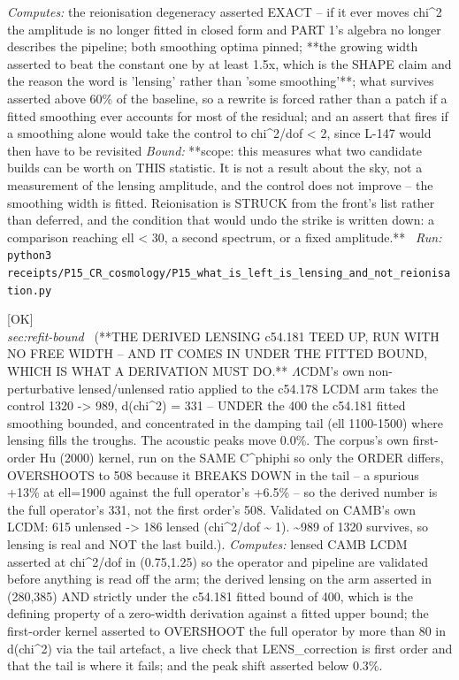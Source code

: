 \begin{description}
\emph{Computes:} the reionisation degeneracy asserted EXACT -- if it ever moves chi\textasciicircum{}2 the amplitude is no longer fitted in closed form and PART 1's algebra no longer describes the pipeline; both smoothing optima pinned; **the growing width asserted to beat the constant one by at least 1.5x, which is the SHAPE claim and the reason the word is 'lensing' rather than 'some smoothing'**; what survives asserted above 60\% of the baseline, so a rewrite is forced rather than a patch if a fitted smoothing ever accounts for most of the residual; and an assert that fires if a smoothing alone would take the control to chi\textasciicircum{}2/dof < 2, since L-147 would then have to be revisited
 \emph{Bound:} **scope: this measures what two candidate builds can be worth on THIS statistic. It is not a result about the sky, not a measurement of the lensing amplitude, and the control does not improve -- the smoothing width is fitted. Reionisation is STRUCK from the front's list rather than deferred, and the condition that would undo the strike is written down: a comparison reaching ell < 30, a second spectrum, or a fixed amplitude.**
\ \emph{Run:} \texttt{python3 receipts/P15\_CR\_cosmology/P15\_what\_is\_left\_is\_lensing\_and\_not\_reionisation.py}
\item[\rcptlabel{P15_derived_lensing_on_the_lcdm_arm}{P15R74}\textbf{P15R74}\quad\texttt{P15\_derived\_lensing\_on\_the\_lcdm\_arm}]\hfill\textsf{[OK]}\\
\textit{sec:refit-bound} \ (**THE DERIVED LENSING c54.181 TEED UP, RUN WITH NO FREE WIDTH -- AND IT COMES IN UNDER THE FITTED BOUND, WHICH IS WHAT A DERIVATION MUST DO.** \ensuremath{\Lambda}CDM's own non-perturbative lensed/unlensed ratio applied to the c54.178 LCDM arm takes the control 1320 -> 989, d(chi\textasciicircum{}2) = 331 -- UNDER the 400 the c54.181 fitted smoothing bounded, and concentrated in the damping tail (ell 1100-1500) where lensing fills the troughs. The acoustic peaks move 0.0\%. The corpus's own first-order Hu (2000) kernel, run on the SAME C\textasciicircum{}phiphi so only the ORDER differs, OVERSHOOTS to 508 because it BREAKS DOWN in the tail -- a spurious +13\% at ell=1900 against the full operator's +6.5\% -- so the derived number is the full operator's 331, not the first order's 508. Validated on CAMB's own LCDM: 615 unlensed -> 186 lensed (chi\textasciicircum{}2/dof \textasciitilde{} 1). \textasciitilde{}989 of 1320 survives, so lensing is real and NOT the last build.). 
\emph{Computes:} lensed CAMB LCDM asserted at chi\textasciicircum{}2/dof in (0.75,1.25) so the operator and pipeline are validated before anything is read off the arm; the derived lensing on the arm asserted in (280,385) AND strictly under the c54.181 fitted bound of 400, which is the defining property of a zero-width derivation against a fitted upper bound; the first-order kernel asserted to OVERSHOOT the full operator by more than 80 in d(chi\textasciicircum{}2) via the tail artefact, a live check that LENS\_correction is first order and that the tail is where it fails; and the peak shift asserted below 0.3\%.

\end{description}
